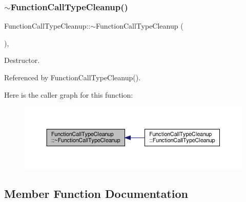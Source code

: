 \subsubsection{\texorpdfstring{$\sim$\+Function\+Call\+Type\+Cleanup()}{~FunctionCallTypeCleanup()}}
{\footnotesize\ttfamily Function\+Call\+Type\+Cleanup\+::$\sim$\+Function\+Call\+Type\+Cleanup (\begin{DoxyParamCaption}{ }\end{DoxyParamCaption})\hspace{0.3cm}{\ttfamily [override]}, {\ttfamily [default]}}



Destructor. 



Referenced by Function\+Call\+Type\+Cleanup().

Here is the caller graph for this function\+:
\nopagebreak
\begin{figure}[H]
\begin{center}
\leavevmode
\includegraphics[width=350pt]{dd/d9e/classFunctionCallTypeCleanup_af5b76386bf8f7a6b30862346a215aa6a_icgraph}
\end{center}
\end{figure}


\subsection{Member Function Documentation}
\mbox{\label{classFunctionCallTypeCleanup_ab88bfd0f5cff395f19c8bf64f45a3657}} 
